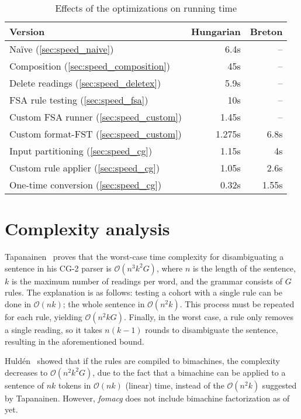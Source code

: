 \documentclass[11pt]{article}
\begin{document}
\begin{table}[h]
  \centering
  \caption{Effects of the optimizations on running time}
  \label{tab:evaluation}
  \begin{tabular}{ | l | r | r | }
  \hline
  \textbf{Version} & \textbf{Hungarian} & \textbf{Breton} \\
  \hline
  Naïve (\ref{sec:speed_naive})                 & 6.4s   & -- \\
  Composition (\ref{sec:speed_composition})     & 45s    & -- \\
  Delete readings (\ref{sec:speed_deletex})     & 5.9s   & -- \\
  FSA rule testing (\ref{sec:speed_fsa})        & 10s    & -- \\
  Custom FSA runner (\ref{sec:speed_custom})    & 1.45s  & -- \\
  Custom format-FST (\ref{sec:speed_custom})    & 1.275s & 6.8s \\
  Input partitioning (\ref{sec:speed_cg})       & 1.15s  & 4s \\
  Custom rule applier (\ref{sec:speed_cg})      & 1.05s  & 2.6s \\
  One-time conversion (\ref{sec:speed_cg})      & 0.32s  & 1.55s \\
  \hline
  \end{tabular}
\end{table}

\section{Complexity analysis}
\label{sec:complex}

Tapanainen~ proves that the worst-case time complexity
for disambiguating a sentence in his CG-2 parser is $\mathcal{O}(n^3k^2G)$,
where $n$ is the length of the sentence, $k$ is the maximum number of readings
per word, and the grammar consists of $G$ rules. The explanation is as follows:
testing a cohort with a single rule can be done in $\mathcal{O}(nk)$; 
the whole sentence in $\mathcal{O}(n^2k)$. This process must be repeated for
each rule, yielding $\mathcal{O}(n^2kG)$. Finally, in the worst case, a rule
only removes a single reading, so it takes $n(k - 1)$ rounds to disambiguate the
sentence, resulting in the aforementioned bound.

Huldén~ showed that if the rules are compiled to bimachines,
the complexity decreases to $\mathcal{O}(n^2k^2G)$, due to the fact that a
bimachine can be applied to a sentence of $nk$ tokens in $\mathcal{O}(nk)$
(linear) time, instead of the $\mathcal{O}(n^2k)$ suggested by Tapanainen.
However, \emph{fomacg} does not include bimachine factorization as of yet.
\end{document}
